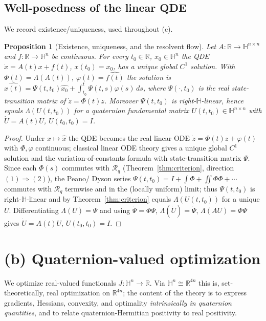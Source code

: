 \documentclass{amsart}
\newtheorem{proposition}[theorem]{Proposition}
\theoremstyle{definition}
\newcommand{\HH}{\mathbb{H}}
\newcommand{\RR}{\mathbb{R}}
\begin{document}
\subsection{Well-posedness of the linear QDE}
We record existence/uniqueness, used throughout (c).

\begin{proposition}[Existence, uniqueness, and the resolvent flow]
\label{prop:wellposed}
Let $A\colon\RR\to\HH^{n\times n}$ and $f\colon\RR\to\HH^n$ be
continuous. For every $t_0\in\RR$, $x_0\in\HH^n$ the QDE
$\dot x=A(t)x+f(t)$, $x(t_0)=x_0$, has a unique global
$C^1$ solution. With $\Phi(t)=\Lambda(A(t))$,
$\varphi(t)=\widehat{f(t)}$ the solution is
$\widehat{x(t)}=\Psi(t,t_0)\widehat{x_0}+\int_{t_0}^t\Psi(t,s)\varphi(s)\,ds$,
where $\Psi(\cdot,t_0)$ is the real state-transition matrix of
$\dot z=\Phi(t)z$. Moreover $\Psi(t,t_0)$ is right-$\HH$-linear, hence
equals $\Lambda(U(t,t_0))$ for a quaternion fundamental matrix
$U(t,t_0)\in\HH^{n\times n}$ with $\dot U=A(t)U$, $U(t_0,t_0)=I$.
\end{proposition}

\begin{proof}
Under $x\mapsto\widehat x$ the QDE becomes the real linear ODE
$\dot z=\Phi(t)z+\varphi(t)$ with $\Phi,\varphi$ continuous; classical
linear ODE theory gives a unique global $C^1$ solution and the
variation-of-constants formula with state-transition matrix $\Psi$.
Since each $\Phi(s)$ commutes with $\mathcal R_q$
(Theorem~\ref{thm:criterion}, direction $(1)\Rightarrow(2)$), the Peano/
Dyson series $\Psi(t,t_0)=I+\int\Phi+\iint\Phi\Phi+\cdots$ commutes with
$\mathcal R_q$ termwise and in the (locally uniform) limit; thus
$\Psi(t,t_0)$ is right-$\HH$-linear and by
Theorem~\ref{thm:criterion} equals $\Lambda(U(t,t_0))$ for a unique
$U$. Differentiating $\Lambda(U)=\Psi$ and using
$\dot\Psi=\Phi\Psi$, $\Lambda(\dot U)=\dot\Psi$, $\Lambda(AU)=\Phi\Psi$
gives $\dot U=A(t)U$, $U(t_0,t_0)=I$.
\end{proof}

\section{(b) Quaternion-valued optimization}
\label{sec:b}

We optimize real-valued functionals $J\colon\HH^n\to\RR$. Via
$\HH^n\cong\RR^{4n}$ this is, set-theoretically, real optimization on
$\RR^{4n}$; the content of the theory is to express gradients, Hessians,
convexity, and optimality \emph{intrinsically in quaternion
quantities}, and to relate quaternion-Hermitian positivity to
real positivity.
\end{document}

